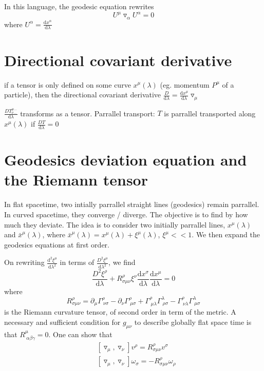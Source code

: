 \documentclass[a4paper]{book}
\theoremstyle{definition}
\theoremstyle{remark}
\begin{document}
In this language, the geodesic equation rewrites 
\begin{equation}
    U^\mu \triangledown_\alpha U^\alpha = 0
\end{equation}
where $U^\alpha = \frac{\text{d}x^\alpha}{\text{d}\lambda}$

\section{Directional covariant derivative}

if a tensor is only defined on some curve $x^\mu(\lambda)$ (eg. momentum $P^\mu$ of a particle), then the directional covariant derivative $\frac{D}{\text{d}\lambda} = \frac{\text{d} x^\mu}{\text{d}\lambda} \triangledown_\mu$\par \medskip 

$\frac{DT^{\mu\dots}_{\nu\dots}}{\text{d}\lambda}$ transforms as a tensor. Parrallel transport: $T$ is parrallel transported along $x^\mu(\lambda)$ if $\frac{DT}{\text{d}\lambda} = 0$


\section{Geodesics deviation equation and the Riemann tensor}

In flat spacetime, two intially parrallel straight lines (geodesics) remain parrallel. In curved spacetime, they converge / diverge. The objective is to find by how much they deviate. The idea is to consider two initially parrallel lines, $x^\mu(\lambda)$ and $\bar{x}^\mu(\lambda)$, where $\bar{x}^\mu(\lambda) = x^\mu(\lambda) + \xi^\mu(\lambda)$, $\xi^\mu << 1$. We then expand the geodesics equations at first order. \par \medskip 

On rewriting $\frac{\text{d}^2\xi^\mu}{\text{d}\lambda^2}$ in terms of $\frac{D^2\xi^\mu}{\text{d}\lambda^2}$, we find 
\begin{equation}
    \frac{D^2 \xi^\rho}{\text{d}\lambda} + R^\rho_{\sigma \mu\nu} \xi^\nu \frac{\text{d}x^\sigma}{\text{d}\lambda}\frac{\text{d}x^\mu}{\text{d}\lambda} = 0
\end{equation}
where 
\begin{equation}
    R^\rho_{\sigma \mu\nu} = \partial_\mu \Gamma^\rho_{~\nu\sigma} - \partial_\nu \Gamma^\rho_{~\mu\sigma} + \Gamma^\rho_{~\mu\lambda}\Gamma^\lambda_{~\rho\sigma} - \Gamma^\rho_{~\nu\lambda}\Gamma^\lambda_{~\mu\sigma}
\end{equation}
is the Riemann curvature tensor, of second order in term of the metric. A necessary and sufficient condition for $g_{\mu\nu}$ to describe globally flat space time is that $R^\mu_{~\alpha \beta\gamma} = 0$. One can show that 
\begin{equation}
    \begin{aligned}
        &[\triangledown_\mu, \triangledown_\nu] v^\rho = R^\rho_{\sigma \mu\nu} v^\sigma \\
        &[\triangledown_\mu, \triangledown_\nu] \omega_\sigma = - R^\rho_{\sigma \mu\nu} \omega_\rho 
    \end{aligned}
\end{equation}\bigskip 
\end{document}
